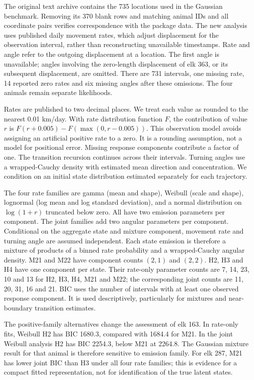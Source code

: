 \documentclass[11pt]{article}
\begin{document}
The original text archive contains the 735 locations used in the Gaussian
benchmark. Removing its 370 blank rows and matching animal IDs and all
coordinate pairs verifies correspondence with the package data. The new
analysis uses published daily movement rates, which adjust displacement for
the observation interval, rather than reconstructing unavailable timestamps.
Rate and angle refer to the outgoing displacement at a location. The first
angle is unavailable; angles involving the zero-length displacement of
elk 363, or its subsequent displacement, are omitted. There are 731
intervals, one missing rate, 14 reported zero rates and six missing angles
after these omissions. The four animals remain separate likelihoods.

Rates are published to two decimal places. We treat each value as rounded
to the nearest 0.01 km/day. With rate distribution function $F$, the
contribution of value $r$ is
$F(r+0.005)-F(\max(0,r-0.005))$. This observation model avoids assigning
an artificial positive rate to a zero. It is a rounding assumption, not a
model for positional error. Missing response components contribute a
factor of one. The transition recursion continues across their intervals.
Turning angles use a wrapped-Cauchy density with estimated mean direction
and concentration. We condition on an initial state distribution estimated
separately for each trajectory.

The four rate families are gamma (mean and shape), Weibull (scale and shape),
lognormal (log mean and log standard deviation), and a normal distribution
on $\log(1+r)$ truncated below zero. All have two emission parameters per
component. The joint families add two angular parameters per component.
Conditional on the aggregate state and mixture component, movement rate
and turning angle are assumed independent. Each state emission is therefore
a mixture of products of a binned rate probability and a wrapped-Cauchy
angular density.
M21 and M22 have component counts $(2,1)$ and $(2,2)$. H2, H3 and H4 have
one component per state. Their rate-only parameter counts are 7, 14, 23,
10 and 13 for H2, H3, H4, M21 and M22; the corresponding joint counts are
11, 20, 31, 16 and 21. BIC uses the number of intervals with at least one
observed response component. It is used descriptively, particularly for
mixtures and near-boundary transition estimates.




The positive-family alternatives change the assessment of elk 163. In
rate-only fits, Weibull H2 has BIC 1680.3, compared with 1684.4 for M21.
In the joint Weibull analysis H2 has BIC 2254.3, below M21 at 2264.8.
The Gaussian mixture result for that animal is therefore sensitive to
emission family. For elk 287, M21 has lower joint BIC than H3 under all
four rate families; this is evidence for a compact fitted representation,
not for identification of the true latent states.
\end{document}
